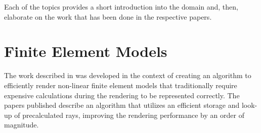 Each of the topics provides a short introduction into the domain and, then, elaborate on the work that has been done in the respective papers.






\section{Finite Element Models} \label{contributions:fem}
The work described in  was developed in the context of creating an algorithm to efficiently render non-linear finite element models that traditionally require expensive calculations during the rendering to be represented correctly.  The papers published describe an algorithm that utilizes an efficient storage and look-up of precalculated rays, improving the rendering performance by an order of magnitude.

